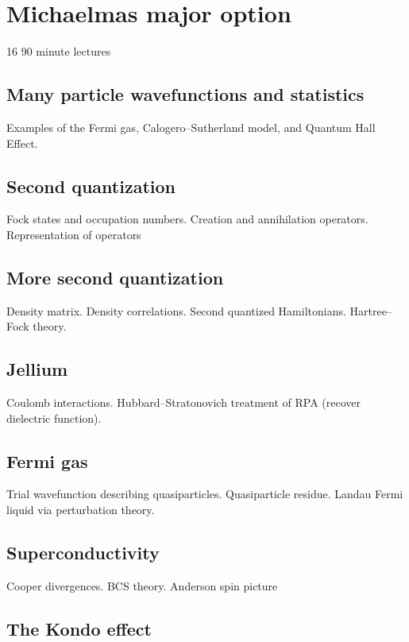 \section{Michaelmas major option}

16 90 minute lectures

\subsection{Many particle wavefunctions and statistics}

Examples of the Fermi gas, Calogero--Sutherland model, and Quantum Hall Effect.

\subsection{Second quantization}

Fock states and occupation numbers. Creation and annihilation operators. Representation of operators

\subsection{More second quantization}

Density matrix. Density correlations. Second quantized Hamiltonians. Hartree--Fock theory.

\subsection{Jellium}

Coulomb interactions. Hubbard--Stratonovich treatment of RPA (recover dielectric function).

\subsection{Fermi gas}

Trial wavefunction describing quasiparticles. Quasiparticle residue. Landau Fermi liquid via perturbation theory. 

\subsection{Superconductivity}

Cooper divergences. BCS theory. Anderson spin picture

\subsection{The Kondo effect}

